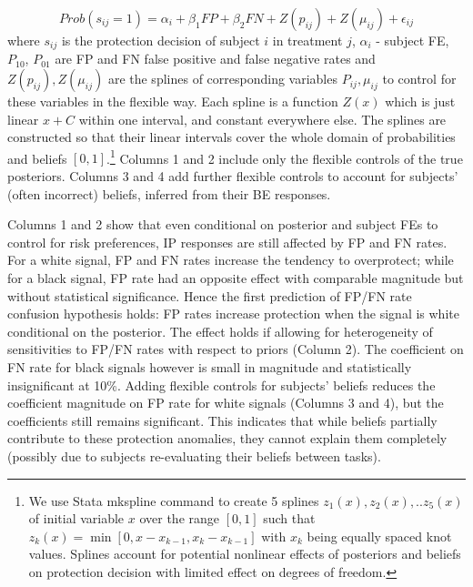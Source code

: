 \documentclass[12pt,a4paper]{article}
\begin{document}
	\[Prob(s_{ij}=1)=\alpha_i+\beta_1 FP +\beta_2 FN +Z(p_{ij})+Z(\mu_{ij})+\epsilon_{ij} \]
where $s_{ij}$ is the protection decision of subject $i$ in treatment $j$, $\alpha_i$ - subject FE, $P_{10}$, $P_{01}$ are FP and FN false positive and false negative rates and $Z(p_{ij}),Z(\mu_{ij})$ are the splines of corresponding variables $P_{ij}, \mu_{ij}$ to control for these variables in the flexible way. Each spline is a function $Z(x)$ which is just linear $x+C$ within one interval, and constant everywhere else. The splines are constructed so that their linear intervals cover the whole domain of probabilities and beliefs $[0,1]$.\footnote{We use Stata mkspline command to create 5 splines $z_1(x),z_2(x),..z_5(x)$ of initial variable $x$ over the range $[0,1]$ such that $z_k(x)=\min[0,x-x_{k-1},x_k-x_{k-1}]$ with $x_k$ being equally spaced knot values. Splines account for potential nonlinear effects of posteriors and beliefs on protection decision with limited effect on degrees of freedom.} Columns 1 and 2 include only the flexible controls of the true posteriors. Columns 3 and 4 add further flexible controls to account for subjects' (often incorrect) beliefs, inferred from their BE responses.

Columns 1 and 2 show that even conditional on posterior and subject FEs to control for risk preferences, IP responses are still affected by FP and FN rates. For a white signal, FP and FN rates increase the tendency to overprotect; while for a black signal, FP rate had an opposite effect with comparable magnitude but without statistical significance. Hence the first prediction of FP/FN rate confusion hypothesis holds: FP rates increase protection when the signal is white conditional on the posterior. The effect holds if allowing for heterogeneity of sensitivities to FP/FN rates with respect to priors (Column 2). The coefficient on FN rate for black signals however is small in magnitude and statistically insignificant at 10\%. Adding flexible controls for subjects' beliefs reduces the coefficient magnitude on FP rate for white signals (Columns 3 and 4), but the coefficients still remains significant. This indicates that while beliefs partially contribute to these protection anomalies, they cannot explain them completely (possibly due to subjects re-evaluating their beliefs between tasks). 
\end{document}
